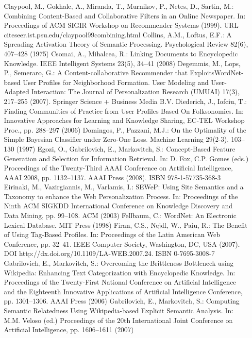 \begin{thebibliography}{110}
Claypool, M., Gokhale, A., Miranda, T., Murnikov, P., Netes, D., Sartin, M.: Combining Content-Based and Collaborative Filters in an Online Newspaper. In: Proceedings of ACM SIGIR Workshop on Recommender Systems (1999). URL citeseer.ist.psu.edu/claypool99combining.html
Collins, A.M., Loftus, E.F.: A Spreading Activation Theory of Semantic Processing. Psychological Review 82(6), 407–428 (1975)
Csomai, A., Mihalcea, R.: Linking Documents to Encyclopedic Knowledge. IEEE Intelligent Systems 23(5), 34–41 (2008)
Degemmis, M., Lops, P., Semeraro, G.: A Content-collaborative Recommender that ExploitsWordNet- based User Profiles for Neighborhood Formation. User Modeling and User-Adapted Interaction: The Journal of Personalization Research (UMUAI) 17(3), 217–255 (2007). Springer Science + Business Media B.V.
Diederich, J., Iofciu, T.: Finding Communities of Practice from User Profiles Based On Folksonomies. In: Innovative Approaches for Learning and Knowledge Sharing, EC-TEL Workshop Proc., pp. 288–297 (2006)
Domingos, P., Pazzani, M.J.: On the Optimality of the Simple Bayesian Classifier under Zero-One Loss. Machine Learning 29(2-3), 103–130 (1997)
Egozi, O., Gabrilovich, E., Markovitch, S.: Concept-Based Feature Generation and Selection for Information Retrieval. In: D. Fox, C.P. Gomes (eds.) Proceedings of the Twenty-Third AAAI Conference on Artificial Intelligence, AAAI 2008, pp. 1132–1137. AAAI Press (2008). ISBN 978-1-57735-368-3
Eirinaki, M., Vazirgiannis, M., Varlamis, I.: SEWeP: Using Site Semantics and a Taxonomy to enhance the Web Personalization Process. In: Proceedings of the Ninth ACM SIGKDD International Conference on Knowledge Discovery and Data Mining, pp. 99–108. ACM (2003)
Fellbaum, C.: WordNet: An Electronic Lexical Database. MIT Press (1998)
Firan, C.S., Nejdl, W., Paiu, R.: The Benefit of Using Tag-Based Profiles. In: Proceedings of the Latin American Web Conference, pp. 32–41. IEEE Computer Society, Washington, DC, USA (2007). DOI http://dx.doi.org/10.1109/LA-WEB.2007.24. ISBN 0-7695-3008-7
Gabrilovich, E., Markovitch, S.: Overcoming the Brittleness Bottleneck using Wikipedia: Enhancing Text Categorization with Encyclopedic Knowledge. In: Proceedings of the Twenty-First National Conference on Artificial Intelligence and the Eighteenth Innovative Applications of Artificial Intelligence Conference, pp. 1301–1306. AAAI Press (2006)
Gabrilovich, E., Markovitch, S.: Computing Semantic Relatedness Using Wikipedia-based Explicit Semantic Analysis. In: M.M. Veloso (ed.) Proceedings of the 20th International Joint Conference on Artificial Intelligence, pp. 1606–1611 (2007)

\end{thebibliography}
